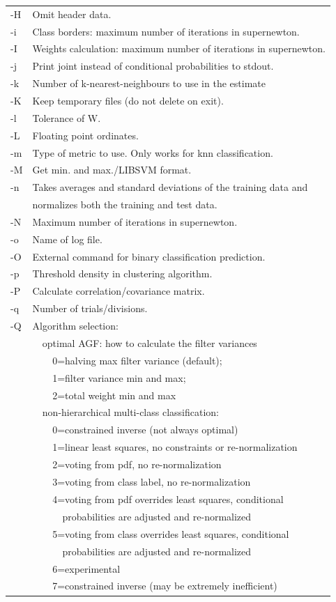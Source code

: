 \documentclass[12pt]{article}
\begin{document}
\begin{tabular}{ll}
-H & Omit header data.\\
-i & Class borders: maximum number of iterations in supernewton.\\
-I & Weights calculation: maximum number of iterations in supernewton.\\
-j & Print joint instead of conditional probabilities to stdout.\\
-k & Number of k-nearest-neighbours to use in the estimate\\
-K & Keep temporary files (do not delete on exit).\\
-l & Tolerance of W.\\
-L & Floating point ordinates.\\
-m & Type of metric to use.  Only works for knn classification.\\
-M & Get min. and max./LIBSVM format.\\
-n & Takes averages and standard deviations of the training data and \\
 & normalizes both the training and test data.\\
-N & Maximum number of iterations in supernewton.\\
-o & Name of log file.\\
-O & External command for binary classification prediction.\\
-p & Threshold density in clustering algorithm.\\
-P & Calculate correlation/covariance matrix.\\
-q & Number of trials/divisions.\\
-Q & Algorithm selection:\\
  & \verb/  /optimal AGF: how to calculate the filter variances\\
  & \verb/    /0=halving max filter variance (default);\\
  & \verb/    /1=filter variance min and max;\\
  & \verb/    /2=total weight min and max\\
  & \verb/  /non-hierarchical multi-class classification:\\
  & \verb/    /0=constrained inverse (not always optimal)\\
  & \verb/    /1=linear least squares, no constraints or re-normalization\\
  & \verb/    /2=voting from pdf, no re-normalization\\
  & \verb/    /3=voting from class label, no re-normalization\\
  & \verb/    /4=voting from pdf overrides least squares, conditional\\
  & \verb/      /probabilities are adjusted and re-normalized\\
  & \verb/    /5=voting from class overrides least squares, conditional\\
  & \verb/      /probabilities are adjusted and re-normalized\\
  & \verb/    /6=experimental\\
  & \verb/    /7=constrained inverse (may be extremely inefficient)
\end{tabular}
\end{document}
